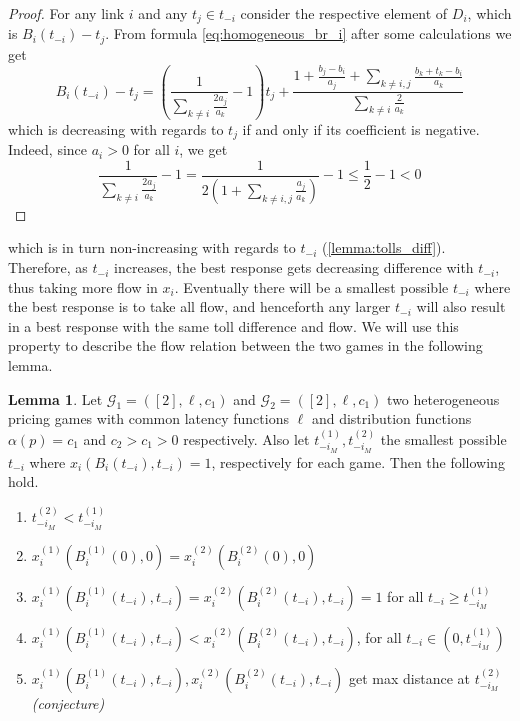 \documentclass[10pt,a4paper]{book}
\newcommand{\Gm}{\mathcal{G}}
\theoremstyle{definition}
\newtheorem{lemma}[definition]{Lemma}
\theoremstyle{comment}
\begin{document}
\begin{proof}
	For any link $i$ and any $t_j \in t_{-i}$ consider the respective element of $D_i$, which is $B_i(t_{-i}) - t_j$.
	From formula \ref{eq:homogeneous_br_i} after some calculations we get
	\[
	B_i(t_{-i}) - t_j = \left(\frac{1}{\sum_{k \ne i} \frac{2a_j}{a_k}} - 1\right)t_j + \frac{1 + \frac{b_j - b_i}{a_j} + \sum_{k \ne i, j}\frac{b_k + t_k - b_i}{a_k}}{\sum_{k \ne i} \frac{2}{a_k}}
	\]
	which is decreasing with regards to $t_j$ if and only if its coefficient is negative.
	Indeed, since $a_i > 0$ for all $i$, we get
	\[
	\frac{1}{\sum_{k \ne i} \frac{2a_j}{a_k}} - 1 = \frac{1}{2 \left(1 + \sum_{k \ne i, j} \frac{a_j}{a_k}\right)} - 1 \leq \frac{1}{2} - 1 < 0
	\]
\end{proof}

 which is in turn non-increasing with regards to $t_{-i}$ (\ref{lemma:tolls_diff}).
Therefore, as $t_{-i}$ increases, the best response gets decreasing difference with $t_{-i}$, thus taking more flow in $x_i$.
Eventually there will be a smallest possible $t_{-i}$ where the best response is to take all flow, and henceforth any larger $t_{-i}$ will also result in a best response with the same toll difference and flow.
We will use this property to describe the flow relation between the two games in the following lemma.

\begin{lemma}
	\label{lemma:a_fixed_t_iM_fixed}
	Let $\Gm_1 = ([2], \ell, c_1)$ and $\Gm_2 = ([2], \ell, c_1)$ two heterogeneous pricing games with common latency functions $\ell$ and distribution functions $\alpha(p) = c_1$ and $c_2 > c_1 > 0$ respectively.
	Also let $t_{-i_M}^{(1)}, t_{-i_M}^{(2)}$ the smallest possible $t_{-i}$ where $x_i(B_i(t_{-i}), t_{-i}) = 1$, respectively for each game.
	Then the following hold.
	\begin{enumerate}[$(i)$]
		\item $t_{-i_M}^{(2)} < t_{-i_M}^{(1)}$
		\item $x_i^{(1)}(B_i^{(1)}(0), 0) = x_i^{(2)}(B_i^{(2)}(0), 0)$
		\item $x_i^{(1)}(B_i^{(1)}(t_{-i}), t_{-i}) = x_i^{(2)}(B_i^{(2)}(t_{-i}), t_{-i}) = 1$ for all $t_{-i} \ge t_{-i_M}^{(1)}$
		\item $x_i^{(1)}(B_i^{(1)}(t_{-i}), t_{-i}) < x_i^{(2)}(B_i^{(2)}(t_{-i}), t_{-i})$, for all $t_{-i} \in (0, t_{-i_M}^{(1)})$
		\item $x_i^{(1)}(B_i^{(1)}(t_{-i}), t_{-i}), x_i^{(2)}(B_i^{(2)}(t_{-i}), t_{-i})$ get max distance at $t_{-i_M}^{(2)}$ \\
		\textit{(conjecture)}
	\end{enumerate}
\end{lemma}
\end{document}
